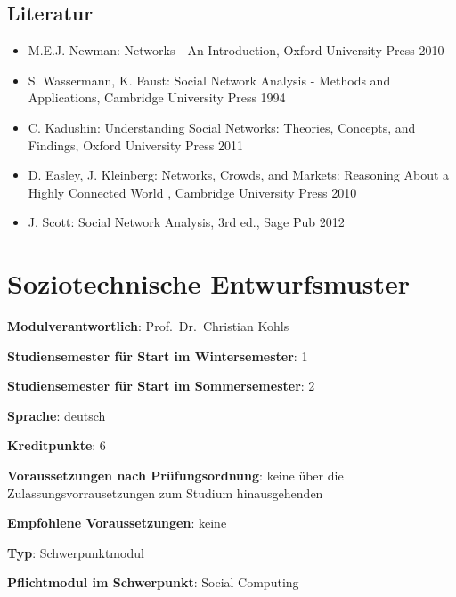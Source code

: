 \section*{Literatur\label{/mi-2017/modulbeschreibungen-master/MA_SC_Modul_Netzwerk--und-Graphentheorie}}\label{literaturpathlabelmi-2017modulbeschreibungen-mastermaux5fscux5fmodulux5fnetzwerkund-graphentheorie}

\begin{itemize}
\tightlist
\item
  M.E.J. Newman: Networks - An Introduction, Oxford University Press
  2010
\item
  S. Wassermann, K. Faust: Social Network Analysis - Methods and
  Applications, Cambridge University Press 1994
\item
  C. Kadushin: Understanding Social Networks: Theories, Concepts, and
  Findings, Oxford University Press 2011
\item
  D. Easley, J. Kleinberg: Networks, Crowds, and Markets: Reasoning
  About a Highly Connected World , Cambridge University Press 2010
\item
  J. Scott: Social Network Analysis, 3rd ed., Sage Pub 2012
\end{itemize}

\chapter{Soziotechnische
Entwurfsmuster\label{/mi-2017/modulbeschreibungen-master/MA_SC_Soziotechnische_Entwurfsmuster}}\label{soziotechnische-entwurfsmusterpathlabelmi-2017modulbeschreibungen-mastermaux5fscux5fsoziotechnischeux5fentwurfsmuster}

\begin{modulHead}
\textbf{Modulverantwortlich}: Prof.~Dr.~Christian
Kohls
\end{modulHead}
\begin{modulHead}
\textbf{Studiensemester für
Start im Wintersemester}:
1
\end{modulHead}
\begin{modulHead}
\textbf{Studiensemester für Start
im Sommersemester}:
2
\end{modulHead}
\begin{modulHead}
\textbf{Sprache}:
deutsch
\end{modulHead}
\begin{modulHead}
\textbf{Kreditpunkte}:
6
\end{modulHead}
\begin{modulHead}
\textbf{Voraussetzungen nach
Prüfungsordnung}: keine über die Zulassungsvorrausetzungen zum Studium
hinausgehenden
\end{modulHead}
\begin{modulHead}
\textbf{Empfohlene
Voraussetzungen}: keine
\end{modulHead}
\begin{modulHead}
\textbf{Typ}:
Schwerpunktmodul
\end{modulHead}
\begin{modulHead}
\textbf{Pflichtmodul
im Schwerpunkt}: Social Computing
\end{modulHead}


